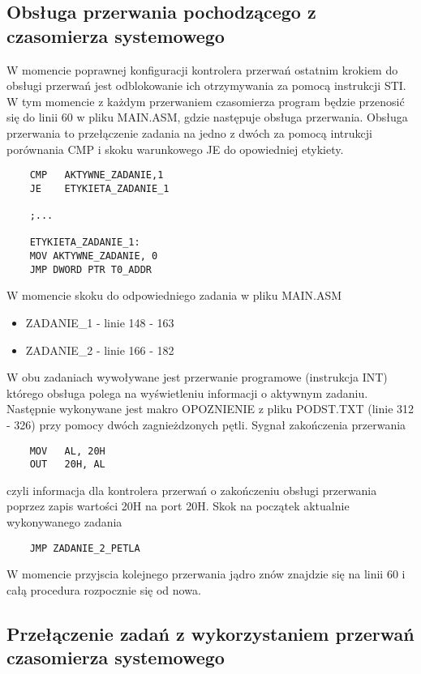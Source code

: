 \documentclass[a4paper,12pt]{article}
\begin{document}
\subsection{Obsługa przerwania pochodzącego z czasomierza systemowego}
W momencie poprawnej konfiguracji kontrolera przerwań ostatnim krokiem do obsługi przerwań jest odblokowanie ich otrzymywania za pomocą instrukcji STI. W tym momencie z każdym przerwaniem czasomierza program będzie przenosić się do linii 60 w pliku MAIN.ASM, gdzie następuje obsługa przerwania.
Obsługa przerwania to przełączenie zadania na jedno z dwóch za pomocą intrukcji porównania CMP i skoku warunkowego JE do opowiedniej etykiety. 

\begin{lstlisting}
	CMP   AKTYWNE_ZADANIE,1
	JE    ETYKIETA_ZADANIE_1  

	;...
		
	ETYKIETA_ZADANIE_1:
	MOV AKTYWNE_ZADANIE, 0	
	JMP DWORD PTR T0_ADDR
\end{lstlisting}

W momencie skoku do odpowiedniego zadania w pliku MAIN.ASM
\begin{itemize}
\item{ZADANIE\_1 - linie 148 - 163}
\item{ZADANIE\_2 - linie 166 - 182}
\end{itemize}
W obu zadaniach wywoływane jest przerwanie programowe (instrukcja INT) którego obsługa polega na wyświetleniu informacji o aktywnym zadaniu. 
Następnie wykonywane jest makro OPOZNIENIE z pliku PODST.TXT  (linie 312 - 326) przy pomocy dwóch zagnieżdzonych pętli. Sygnał zakończenia przerwania
\begin{lstlisting}
	MOV   AL, 20H
	OUT   20H, AL
\end{lstlisting}

czyli informacja dla kontrolera przerwań o zakończeniu obsługi przerwania poprzez zapis wartości 20H na port 20H. Skok na początek aktualnie wykonywanego zadania
\begin{lstlisting}
	JMP ZADANIE_2_PETLA
\end{lstlisting}
W momencie przyjscia kolejnego przerwania jądro znów znajdzie się na linii 60 i całą procedura rozpocznie się od nowa. 

\subsection{Przełączenie zadań z wykorzystaniem przerwań czasomierza systemowego}
\end{document}
